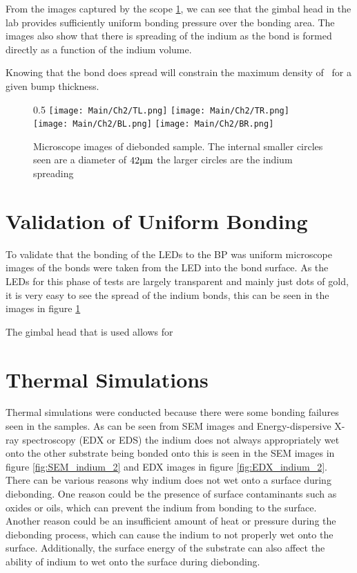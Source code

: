 From the images captured by the scope \ref{fig:microscopeIndium}, we can see that the gimbal head in the lab provides sufficiently uniform bonding pressure over the bonding area. The images also show that there is spreading of the indium as the bond is formed directly as a function of the indium volume.

Knowing that the bond does spread will constrain the maximum density of \uleds \ for a given bump thickness.

\begin{figure}{0.5\textwidth}
    \centering
    \texttt{[image: Main/Ch2/TL.png]}
    \texttt{[image: Main/Ch2/TR.png]} \\
    \texttt{[image: Main/Ch2/BL.png]}
    \texttt{[image: Main/Ch2/BR.png]}
    \caption{Microscope images of diebonded sample. The internal smaller circles seen are a diameter of $42 \um$ the larger circles are the indium spreading}
    \label{fig:microscopeIndium}
\end{figure}

\section{Validation of Uniform Bonding}
\label{sec:uniformBond}
To validate that the bonding of the LEDs to the BP was uniform microscope images of the bonds were taken from the LED into the bond surface. As the LEDs for this phase of tests are largely transparent and mainly just dots of gold, it is very easy to see the spread of the indium bonds, this can be seen in the images in figure \ref{fig:microscopeIndium}

The gimbal head that is used %
allows for

\section{Thermal Simulations}

Thermal simulations were conducted because there were some bonding failures seen in the samples. As can be seen from SEM images and Energy-dispersive X-ray spectroscopy (EDX or EDS) the indium does not always appropriately wet onto the other substrate being bonded onto this is seen in the SEM images in figure
\ref{fig:SEM_indium_2} and EDX images in figure \ref{fig:EDX_indium_2}.
There can be various reasons why indium does not wet onto a surface during diebonding. One reason could be the presence of surface contaminants such as oxides or oils, which can prevent the indium from bonding to the surface. Another reason could be an insufficient amount of heat or pressure during the diebonding process, which can cause the indium to not properly wet onto the surface. Additionally, the surface energy of the substrate can also affect the ability of indium to wet onto the surface during diebonding.

